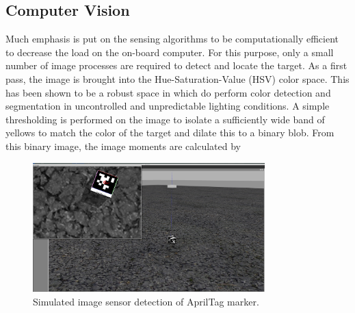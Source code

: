 \subsection{Computer Vision}\label{s:landing:cv}
Much emphasis is put on the sensing algorithms to be computationally efficient to decrease the load on the
on-board computer. For this purpose, only a small number of image processes are required to detect and locate
the target. As a first pass, the image is brought into the Hue-Saturation-Value (HSV) color space. This has
been shown to be a robust space in which do perform color detection and segmentation in uncontrolled and
unpredictable lighting conditions\cite{zhao2002robust}. A simple thresholding is performed on the image to
isolate a sufficiently wide band of yellows to match the color of the target and dilate this to a binary blob.
From this binary image, the image moments are calculated by
\begin{figure}[ht]
    \centering
    \includegraphics[width=0.8\textwidth]{images/rs_working_apriltags_crop.png}
    \caption{Simulated image sensor detection of AprilTag marker.}\label{f:apriltag}
\end{figure}

